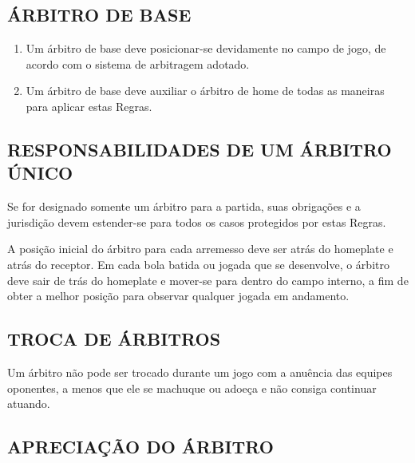 \subsection{ÁRBITRO DE BASE}
\begin{enumerate}[label=(\alph*)]
	\item Um árbitro de base deve posicionar-se devidamente no campo de jogo, de acordo com o sistema de arbitragem adotado.
	\item Um árbitro de base deve auxiliar o árbitro de \gls{home} de todas as maneiras para aplicar estas Regras.
\end{enumerate}

\subsection{RESPONSABILIDADES DE UM ÁRBITRO ÚNICO}

Se for designado somente um árbitro para a partida, suas obrigações e a jurisdição devem estender-se para todos os casos protegidos por estas Regras.

A posição inicial do árbitro para cada arremesso deve ser atrás do \gls{homeplate} e atrás do receptor. Em cada bola batida ou jogada que se desenvolve, o árbitro deve sair de trás do \gls{homeplate} e mover-se para dentro do campo interno, a fim de obter a melhor posição para observar qualquer jogada em andamento.

\subsection{TROCA DE ÁRBITROS}
Um árbitro não pode ser trocado durante um jogo com a anuência das equipes oponentes, a menos que ele se machuque ou adoeça e não consiga continuar atuando.

\subsection{APRECIAÇÃO DO ÁRBITRO}

